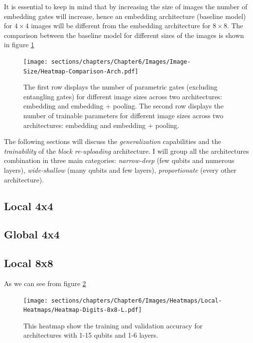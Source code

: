 It is essential to keep in mind that by increasing the size of images the number of embedding gates will
increase, hence an embedding architecture (baseline model) for $4\times4$ images will be different 
from the embedding architecture for $8\times8$.
The comparison between the baseline model for different sizes of the images is shown in figure 
\ref{arc:embed-pooling}

\begin{figure}[h]
    \centering
    \texttt{[image: sections/chapters/Chapter6/Images/Image-Size/Heatmap-Comparison-Arch.pdf]}
    \caption{The first row displays the number of parametric gates (excluding entangling gates) for 
    different image sizes across two architectures: embedding and embedding + pooling.
    The second row displays the number of trainable parameters for 
    different image sizes across two architectures: embedding and embedding + pooling.}
    \label{arc:embed-pooling}
\end{figure}


The following sections will discuss the \textit{generalization} capabilities and the 
\textit{trainability} of the \textit{block re-uploading} architecture.
I will group all the architectures combination in three main categories: \textit{narrow-deep} 
(few qubits and numerous layers), \textit{wide-shallow} (many qubits and few layers), \textit{proportionate}
(every other architecture). 


\subsection{Local 4x4}


\subsection{Global 4x4}


\subsection{Local 8x8}

As we can see from figure \ref{fig:heatmap-8x8-L}

\begin{figure}[h]
    \texttt{[image: sections/chapters/Chapter6/Images/Heatmaps/Local-Heatmaps/Heatmap-Digits-8x8-L.pdf]}
    \caption{This heatmap show the training and validation accuracy for architectures with 1-15 qubits and
    1-6 layers.}
    \label{fig:heatmap-8x8-L}
\end{figure}

